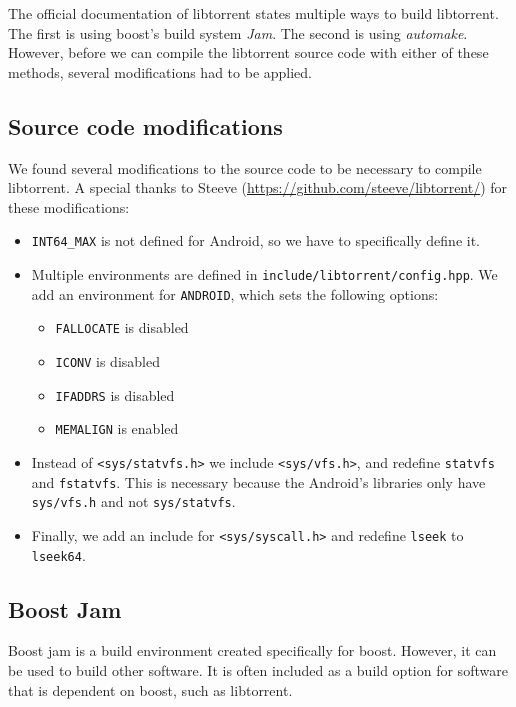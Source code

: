 		The official documentation of libtorrent states multiple ways to build libtorrent. The first is using boost's build system \emph{Jam}. The second is using \emph{automake}. However, before we can compile the libtorrent source code with either of these methods, several modifications had to be applied.
		
		\subsection{Source code modifications}
				
		We found several modifications to the source code to be necessary to compile libtorrent. A special thanks to Steeve (\url{https://github.com/steeve/libtorrent/}) for these modifications:
		
		\begin{itemize}
		\item \texttt{INT64\_MAX} is not defined for Android, so we have to specifically define it.
		\item Multiple environments are defined in \texttt{include/libtorrent/config.hpp}. We add an environment for \texttt{ANDROID}, which sets the following options:
			\begin{itemize}
				\item \texttt{FALLOCATE} is disabled
				\item \texttt{ICONV} is disabled
				\item \texttt{IFADDRS} is disabled
				\item \texttt{MEMALIGN} is enabled
			\end{itemize}
		\item Instead of \texttt{<sys/statvfs.h>} we include \texttt{<sys/vfs.h>}, and redefine \texttt{statvfs} and \texttt{fstatvfs}. This is necessary because the Android's libraries only have \texttt{sys/vfs.h} and not \texttt{sys/statvfs}.
		\item Finally, we add an include for \texttt{<sys/syscall.h>} and redefine \texttt{lseek} to \texttt{lseek64}.
		\end{itemize}
		
		\subsection{Boost Jam}
		Boost jam is a build environment created specifically for boost. However, it can be used to build other software. It is often included as a build option for software that is dependent on boost, such as libtorrent.
		
